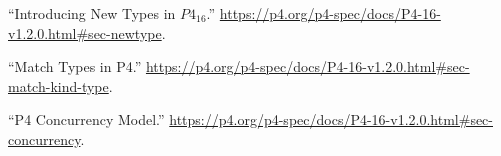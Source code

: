 \documentclass[11pt]{article}
\begin{document}
{{\begin{thebibliography}{38}
\mdbibitemlabel{{}[11]}\textquotedblleft{}Introducing New Types in $P4_{16}$.\textquotedblright{} \href{https://p4.org/p4-spec/docs/P4-16-v1.2.0.html\%23sec-newtype}{{\ttfamily https://\hspace{0pt}p4.\hspace{0pt}org/\hspace{0pt}p4-\hspace{0pt}spec/\hspace{0pt}docs/\hspace{0pt}P4-\hspace{0pt}16-\hspace{0pt}v1.\hspace{0pt}2.\hspace{0pt}0.\hspace{0pt}html\#\hspace{0pt}sec-\hspace{0pt}newtype}}.\label{p4newtypes}%

\mdbibitemlabel{{}[12]}\textquotedblleft{}Match Types in P4.\textquotedblright{} \href{https://p4.org/p4-spec/docs/P4-16-v1.2.0.html\%23sec-match-kind-type}{{\ttfamily https://\hspace{0pt}p4.\hspace{0pt}org/\hspace{0pt}p4-\hspace{0pt}spec/\hspace{0pt}docs/\hspace{0pt}P4-\hspace{0pt}16-\hspace{0pt}v1.\hspace{0pt}2.\hspace{0pt}0.\hspace{0pt}html\#\hspace{0pt}sec-\hspace{0pt}match-\hspace{0pt}kind-\hspace{0pt}type}}.\label{p4matchtypes}%

\mdbibitemlabel{{}[13]}\textquotedblleft{}P4 Concurrency Model.\textquotedblright{} \href{https://p4.org/p4-spec/docs/P4-16-v1.2.0.html\%23sec-concurrency}{{\ttfamily https://\hspace{0pt}p4.\hspace{0pt}org/\hspace{0pt}p4-\hspace{0pt}spec/\hspace{0pt}docs/\hspace{0pt}P4-\hspace{0pt}16-\hspace{0pt}v1.\hspace{0pt}2.\hspace{0pt}0.\hspace{0pt}html\#\hspace{0pt}sec-\hspace{0pt}concurrency}}.\label{p4concurrency}%


\end{thebibliography}}}
\end{document}

